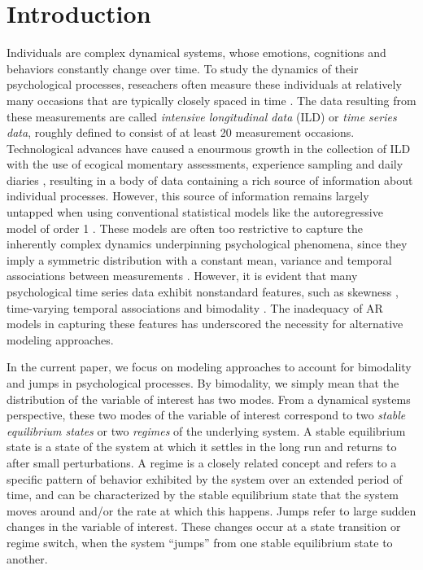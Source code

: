 \documentclass{article}
\begin{document}
\section{Introduction}
Individuals are complex dynamical systems, whose emotions, cognitions and behaviors constantly change over time.
To study the dynamics of their psychological processes, reseachers often measure these individuals at relatively many occasions that are typically closely spaced in time \citep{bolger2013intensive, walls2006models}.
The data resulting from these measurements are called \textit{intensive longitudinal data} (ILD) or \textit{time series data}, roughly defined to consist of at least 20 measurement occasions.
Technological advances have caused a enourmous growth in the collection of ILD with the use of ecogical momentary assessments, experience sampling and daily diaries \citep{notimelikethepresent}, resulting in a body of data containing a rich source of information about individual processes.
However, this source of information remains largely untapped when using conventional statistical models like the autoregressive model of order 1 \citep[AR(1),][]{box_jenkins, chatfield}. These models are often too restrictive to capture the inherently complex dynamics underpinning psychological phenomena, since they imply a symmetric distribution with a constant mean, variance and temporal associations between measurements \citep{formal_theory_1, changing_inertia_2}.
However, it is evident that many psychological time series data exhibit nonstandard features, such as skewness \citep{skewness_oisin, skewness_2, skewness_3}, time-varying temporal associations \citep{changing_inertia_1, changing_inertia_2} and bimodality \citep{skewness_oisin, bimodality_han}.
The inadequacy of AR models in capturing these features has underscored the necessity for alternative modeling approaches.

In the current paper, we focus on modeling approaches to account for bimodality and jumps in psychological processes.
By bimodality, we simply mean that the distribution of the variable of interest has two modes.
From a dynamical systems perspective, these two modes of the variable of interest correspond to two \textit{stable equilibrium states} or two \textit{regimes} of the underlying system.
A stable equilibrium state is a state of the system at which it settles in the long run and returns to after small perturbations.
A regime is a closely related concept and refers to a specific pattern of behavior exhibited by the system over an extended period of time, and can be characterized by the stable equilibrium state that the system moves around and/or the rate at which this happens.
Jumps refer to large sudden changes in the variable of interest.
These changes occur at a state transition or regime switch, when the system ``jumps'' from one stable equilibrium state to another.
\end{document}
